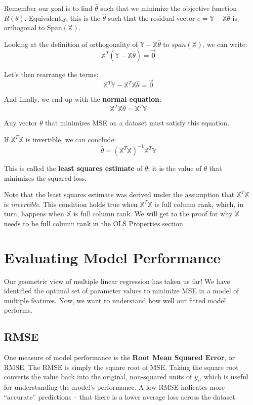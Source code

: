 \documentclass[
  letterpaper,
  DIV=11,
  numbers=noendperiod]{scrreprt}
\begin{document}
Remember our goal is to find \(\hat{\theta}\) such that we minimize the
objective function \(R(\theta)\). Equivalently, this is the
\(\hat{\theta}\) such that the residual vector
\(e = \mathbb{Y} - \mathbb{X} \hat{\theta}\) is orthogonal to
\(\text{Span}(\mathbb{X})\).

Looking at the definition of orthogonality of
\(\mathbb{Y} - \mathbb{X}\hat{\theta}\) to \(span(\mathbb{X})\), we can
write: \[\mathbb{X}^T (\mathbb{Y} - \mathbb{X}\hat{\theta}) = \vec{0}\]

Let's then rearrange the terms:
\[\mathbb{X}^T \mathbb{Y} - \mathbb{X}^T \mathbb{X} \hat{\theta} = \vec{0}\]

And finally, we end up with the \textbf{normal equation}:
\[\mathbb{X}^T \mathbb{X} \hat{\theta} = \mathbb{X}^T \mathbb{Y}\]

Any vector \(\theta\) that minimizes MSE on a dataset must satisfy this
equation.

If \(\mathbb{X}^T \mathbb{X}\) is invertible, we can conclude:
\[\hat{\theta} = (\mathbb{X}^T \mathbb{X})^{-1} \mathbb{X}^T \mathbb{Y}\]

This is called the \textbf{least squares estimate} of \(\theta\): it is
the value of \(\theta\) that minimizes the squared loss.

Note that the least squares estimate was derived under the assumption
that \(\mathbb{X}^T \mathbb{X}\) is \emph{invertible}. This condition
holds true when \(\mathbb{X}^T \mathbb{X}\) is full column rank, which,
in turn, happens when \(\mathbb{X}\) is full column rank. We will get to
the proof for why \(\mathbb{X}\) needs to be full column rank in the OLS
Properties section.

\section{Evaluating Model
Performance}\label{evaluating-model-performance}

Our geometric view of multiple linear regression has taken us far! We
have identified the optimal set of parameter values to minimize MSE in a
model of multiple features. Now, we want to understand how well our
fitted model performs.

\subsection{RMSE}\label{rmse}

One measure of model performance is the \textbf{Root Mean Squared
Error}, or RMSE. The RMSE is simply the square root of MSE. Taking the
square root converts the value back into the original, non-squared units
of \(y_i\), which is useful for understanding the model's performance. A
low RMSE indicates more ``accurate'' predictions -- that there is a
lower average loss across the dataset.
\end{document}

